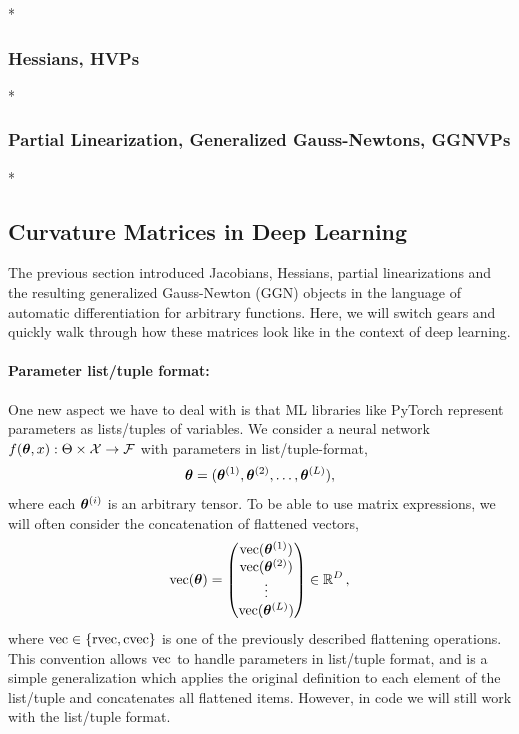 \switchcolumn[0]*
\subsubsection{Hessians, HVPs}


\switchcolumn[0]*
\subsubsection{Partial Linearization, Generalized Gauss-Newtons, GGNVPs}\label{sec:partial_linearization}


\switchcolumn[0]*
\subsection{Curvature Matrices in Deep Learning}

The previous section introduced Jacobians, Hessians, partial linearizations and the resulting generalized Gauss-Newton (GGN) objects in the language of automatic differentiation for arbitrary functions.
Here, we will switch gears and quickly walk through how these matrices look like in the context of deep learning.

\switchcolumn[1]
\switchcolumn[0]

\paragraph{Parameter list/tuple format:} One new aspect we have to deal with is that ML libraries like PyTorch represent parameters as lists/tuples of variables.
We consider a neural network $f(\vtheta, x): \Theta \times \gX \to \gF$ with parameters in list/tuple-format,
\begin{align*}
  \vtheta = (\vtheta^{(1)}, \vtheta^{(2)}, \ldots, \vtheta^{(L)}),
\end{align*}
where each $\vtheta^{(i)}$ is an arbitrary tensor. To be able to use matrix expressions, we will often consider the concatenation of flattened vectors,
\begin{align*}
  \vec(\vtheta)
  =
  \begin{pmatrix}
    \vec(\vtheta^{(1)}) \\
    \vec(\vtheta^{(2)}) \\
    \vdots              \\
    \vec(\vtheta^{(L)})
  \end{pmatrix}
  \in \sR^D
  \,,
\end{align*}
where $\vec \in \{ \rvec, \cvec \}$ is one of the previously described flattening operations.
This convention allows $\vec$ to handle parameters in list/tuple format, and is a simple generalization which applies the original definition to each element of the list/tuple and concatenates all flattened items.
However, in code we will still work with the list/tuple format.

